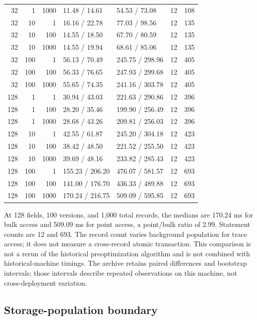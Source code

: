 \documentclass[11pt,a4paper]{article}
\begin{document}
\begin{longtable}{@{}rrrllrr@{}}
32 & 1 & 1000 & 11.48 / 14.61 & 54.53 / 73.08 & 12 & 108 \\
32 & 10 & 1 & 16.16 / 22.78 & 77.03 / 98.56 & 12 & 135 \\
32 & 10 & 100 & 14.55 / 18.50 & 67.70 / 80.59 & 12 & 135 \\
32 & 10 & 1000 & 14.55 / 19.94 & 68.61 / 85.06 & 12 & 135 \\
32 & 100 & 1 & 56.13 / 70.49 & 245.75 / 298.96 & 12 & 405 \\
32 & 100 & 100 & 56.33 / 76.65 & 247.93 / 299.68 & 12 & 405 \\
32 & 100 & 1000 & 55.65 / 74.35 & 241.16 / 303.78 & 12 & 405 \\
128 & 1 & 1 & 30.94 / 43.03 & 221.63 / 290.86 & 12 & 396 \\
128 & 1 & 100 & 28.20 / 35.46 & 199.90 / 256.49 & 12 & 396 \\
128 & 1 & 1000 & 28.68 / 43.26 & 209.81 / 256.03 & 12 & 396 \\
128 & 10 & 1 & 42.55 / 61.87 & 245.20 / 304.18 & 12 & 423 \\
128 & 10 & 100 & 38.42 / 48.50 & 221.52 / 255.50 & 12 & 423 \\
128 & 10 & 1000 & 39.69 / 48.16 & 233.82 / 285.43 & 12 & 423 \\
128 & 100 & 1 & 155.23 / 206.20 & 476.07 / 581.57 & 12 & 693 \\
128 & 100 & 100 & 141.00 / 176.70 & 436.33 / 489.88 & 12 & 693 \\
128 & 100 & 1000 & 170.24 / 216.75 & 509.09 / 595.85 & 12 & 693 \\
\end{longtable}
\endgroup


At 128 fields, 100 versions, and 1,000 total records, the medians are 170.24 ms for bulk access and 509.09 ms for point access, a point/bulk ratio of 2.99. Statement counts are 12 and 693. The record count varies background population for trace access; it does not measure a cross-record atomic transaction. This comparison is not a rerun of the historical preoptimization algorithm and is not combined with historical-machine timings. The archive retains paired differences and bootstrap intervals; those intervals describe repeated observations on this machine, not cross-deployment variation.

\subsection{Storage-population boundary}
\end{document}
